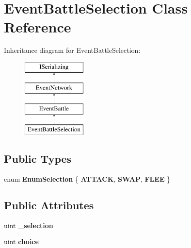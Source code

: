 \hypertarget{class_event_battle_selection}{\section{Event\-Battle\-Selection Class Reference}
\label{class_event_battle_selection}
}
Inheritance diagram for Event\-Battle\-Selection\-:\begin{figure}[H]
\begin{center}
\leavevmode
\includegraphics[height=4.000000cm]{class_event_battle_selection}
\end{center}
\end{figure}
\subsection*{Public Types}
\begin{DoxyCompactItemize}
\item 
enum {\bfseries Enum\-Selection} \{ {\bfseries A\-T\-T\-A\-C\-K}, 
{\bfseries S\-W\-A\-P}, 
{\bfseries F\-L\-E\-E}
 \}
\end{DoxyCompactItemize}
\subsection*{Public Attributes}
\begin{DoxyCompactItemize}
\item 
\hypertarget{class_event_battle_selection_a3f31e68cd024e74edbf0d8732d8d4cf6}{uint {\bfseries \-\_\-selection}}\label{class_event_battle_selection_a3f31e68cd024e74edbf0d8732d8d4cf6}

\item 
\hypertarget{class_event_battle_selection_afee34860cf0eab39082bc15a73d8e299}{uint {\bfseries choice}}\label{class_event_battle_selection_afee34860cf0eab39082bc15a73d8e299}

\end{DoxyCompactItemize}
